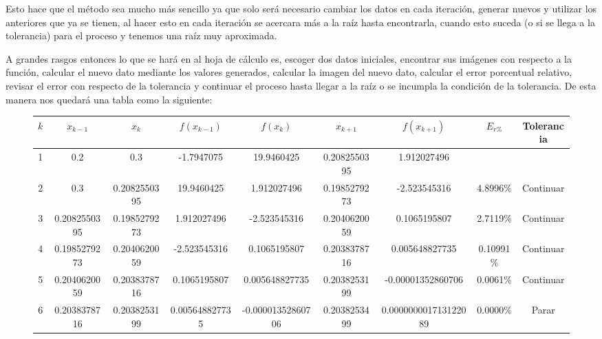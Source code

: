 \documentclass{article}
\begin{document}
Esto hace que el método sea mucho más sencillo ya que solo será necesario cambiar los datos en cada iteración, generar nuevos
y utilizar los anteriores que ya se tienen, al hacer esto en cada iteración se acercara más a la raíz hasta encontrarla, cuando
esto suceda (o si se llega a la tolerancia) para el proceso y tenemos una raíz muy aproximada.


A grandes rasgos entonces lo que se hará en al hoja de cálculo es, escoger dos datos iniciales, encontrar sus imágenes con
respecto a la función, calcular el nuevo dato mediante los valores generados, calcular la imagen del nuevo dato, calcular
el error porcentual relativo, revisar el error con respecto de la tolerancia y continuar el proceso hasta llegar a la raíz
o se incumpla la condición de la tolerancia. De esta manera nos quedará una tabla como la siguiente:


\begin{figure}[h]
   \begin{adjustwidth}{-4cm}{0cm} %
       \centering
       \resizebox{20.5cm}{!} {
       \begin{tabular}{| c | c | c | c | c | c | c | c | c |}
           \hline
           $k$ & $x_{k-1}$ & $x_k$ & $f(x_{k-1})$ &$f(x_k)$ & $x_{k+1}$& $f(x_{k+1})$ & $E_{r\%}$ & Tolerancia \\ \hline
              1 & 0.2&0.3&-1.7947075&19.9460425&0.2082550395&1.912027496& & \\ \hline
              2 &0.3&0.2082550395&19.9460425&1.912027496&0.1985279273&-2.523545316&4.8996\%&Continuar \\ \hline
              3 &0.2082550395&0.1985279273&1.912027496&-2.523545316&0.2040620059&0.1065195807&2.7119\%&Continuar \\ \hline
              4 &0.1985279273&0.2040620059&-2.523545316&0.1065195807&0.2038378716&0.005648827735&0.10991\%&Continuar \\ \hline
              5 &0.2040620059&0.2038378716&0.1065195807&0.005648827735&0.2038253199&-0.00001352860706&0.0061\%&Continuar \\ \hline
              6 &0.2038378716&0.2038253199&0.005648827735&-0.00001352860706&0.2038253499&0.000000001713122089&0.0000\%&Parar \\ \hline
       \end{tabular}
       }
   \end{adjustwidth}
\end{figure}
\end{document}
